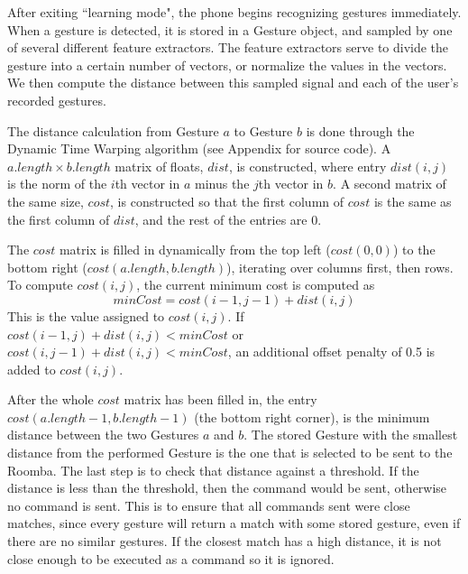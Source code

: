 \documentclass[12pt, letterpaper]{report}
\begin{document}
After exiting ``learning mode", the phone begins recognizing gestures immediately. When a gesture is detected, it is stored in a Gesture object, and sampled by one of several different feature extractors. The feature extractors serve to divide the gesture into a certain number of vectors, or normalize the values in the vectors. We then compute the distance between this sampled signal and each of the user's recorded gestures.

The distance calculation from Gesture $a$ to Gesture $b$ is done through the Dynamic Time Warping algorithm (see Appendix for source code). A $a.length \times b.length$ matrix of floats, $dist$, is constructed, where entry $dist(i,j)$ is the norm of the $i$th vector in $a$ minus the $j$th vector in $b$. A second matrix of the same size, $cost$, is constructed so that the first column of $cost$ is the same as the first column of $dist$, and the rest of the entries are 0.

The $cost$ matrix is filled in dynamically from the top left ($cost(0, 0)$) to the bottom right ($cost(a.length, b.length)$), iterating over columns first, then rows. To compute $cost(i, j)$, the current minimum cost is computed as \[minCost = cost(i - 1, j - 1) + dist(i, j)\] This is the value assigned to $cost(i, j)$. If $cost(i - 1, j) + dist(i, j) < minCost$ or $cost(i, j - 1) + dist(i, j) < minCost$, an additional offset penalty of 0.5 is added to $cost(i, j)$.

After the whole $cost$ matrix has been filled in, the entry $cost(a.length - 1, b.length - 1)$ (the bottom right corner), is the minimum distance between the two Gestures $a$ and $b$. The stored Gesture with the smallest distance from the performed Gesture is the one that is selected to be sent to the Roomba. The last step is to check that distance against a threshold. If the distance is less than the threshold, then the command would be sent, otherwise no command is sent. This is to ensure that all commands sent were close matches, since every gesture will return a match with some stored gesture, even if there are no similar gestures. If the closest match has a high distance, it is not close enough to be executed as a command so it is ignored.
\end{document}
